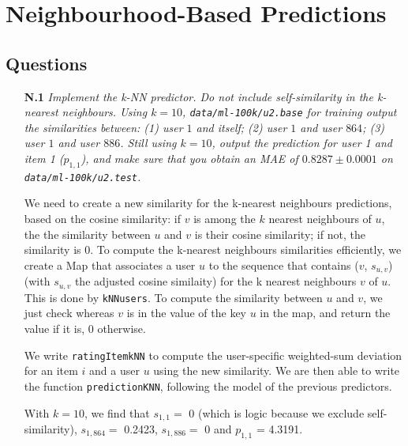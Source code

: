 \documentclass{article}
\begin{document}
\section{Neighbourhood-Based Predictions}


\subsection{Questions}
\label{section:q2}

\begin{itemize}    
        \item [\textbf{N.1}] \textit{Implement the k-NN predictor. Do not include self-similarity in the k-nearest neighbours. Using $k=10$,  \texttt{data/ml-100k/u2.base} for training output the similarities between: (1) user $1$ and itself; (2) user $1$ and user $864$; (3) user $1$ and user $886$. Still using $k=10$, output the prediction for user 1 and item 1 ($p_{1,1}$), and make sure that you obtain an MAE of $0.8287 \pm 0.0001$ on \texttt{data/ml-100k/u2.test}.} 
        
        We need to create a new similarity for the k-nearest neighbours predictions, based on the cosine similarity: if $v$ is among the $k$ nearest neighbours of $u$, the the similarity between $u$ and $v$ is their cosine similarity; if not, the similarity is 0. To compute the k-nearest neighbours similarities efficiently, we create a Map that associates a user $u$ to the sequence that contains ($v$, $s_{u,v}$) (with $s_{u,v}$ the adjusted cosine similaity) for the k nearest neighbours $v$ of $u$. This is done by \texttt{kNNusers}. To compute the similarity between $u$ and $v$, we just check whereas $v$ is in the value of the key $u$ in the map, and return the value if it is, 0 otherwise.
        
        We write \texttt{ratingItemkNN} to compute the user-specific weighted-sum deviation for an item $i$ and a user $u$ using the new similarity. We are then able to write the function \texttt{predictionKNN}, following the model of the previous predictors.
        
        With $k=10$, we find that $s_{1,1}=$ 0 (which is logic because we exclude self-similarity), $s_{1,864}=$ 0.2423, $s_{1,886}=$ 0 and $p_{1,1}$ =  4.3191.
    

\end{itemize}
\end{document}
